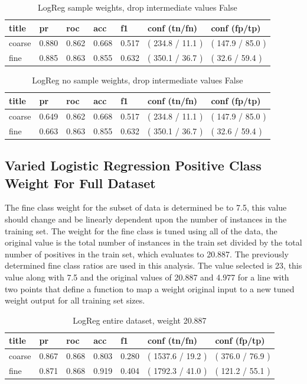 \documentclass[ms]{nuthesis}
\begin{document}
\FloatBarrier
\begin{table}[h]
\centering
\begin{tabular}{|l||l||l||l||l||l||l|}\toprule
title & pr & roc & acc & f1 & conf (tn/fn) & conf (fp/tp) \\ \midrule
coarse & 0.880 & 0.862 & 0.668 & 0.517 & ( 234.8 / 11.1 ) & ( 147.9 / 85.0 ) \\
fine & 0.885 & 0.863 & 0.855 & 0.632 & ( 350.1 / 36.7 ) & ( 32.6 / 59.4 ) \\ \bottomrule
\end{tabular}
\caption{LogReg sample weights, drop intermediate values False}
\label{tab:LogReg-DropFalse}
\end{table}
\FloatBarrier

\FloatBarrier
\begin{table}[h]
\centering
\begin{tabular}{|l||l||l||l||l||l||l|}\toprule
title & pr & roc & acc & f1 & conf (tn/fn) & conf (fp/tp) \\ \midrule
coarse & 0.649 & 0.862 & 0.668 & 0.517 & ( 234.8 / 11.1 ) & ( 147.9 / 85.0 ) \\
fine & 0.663 & 0.863 & 0.855 & 0.632 & ( 350.1 / 36.7 ) & ( 32.6 / 59.4 ) \\ \bottomrule
\end{tabular}
\caption{LogReg no sample weights, drop intermediate values False}
\label{tab:LogReg-NoSW-DropFalse}
\end{table}
\FloatBarrier


\subsection{Varied Logistic Regression Positive Class Weight For Full Dataset}
\par The fine class weight for the subset of data is determined be to 7.5, this value
should change and be linearly dependent upon the number of instances in the training set.
The weight for the fine class is tuned using all of the data, the original value is the total number
of instances in the train set divided by the total number of positives in the train set, which evaluates
to 20.887. The previously determined fine class ratios are used in this analysis. The value selected is
23, this value along with 7.5 and the original values of 20.887 and 4.977 for a line with two points that
define a function to map a weight original input to a new tuned weight output for all training set sizes.

\FloatBarrier
\begin{table}[H]
\centering
\begin{tabular}{|l||l||l||l||l||l||l|}\toprule
title & pr & roc & acc & f1 & conf (tn/fn) & conf (fp/tp) \\ \midrule
coarse & 0.867 & 0.868 & 0.803 & 0.280 & ( 1537.6 / 19.2 ) & ( 376.0 / 76.9 ) \\
fine & 0.871 & 0.868 & 0.919 & 0.404 & ( 1792.3 / 41.0 ) & ( 121.2 / 55.1 ) \\ \bottomrule
\end{tabular}
\caption{LogReg entire dataset, weight 20.887}
\label{tab:LogRegAllOrig-Wt20p887}
\end{table}
\FloatBarrier
\end{document}
